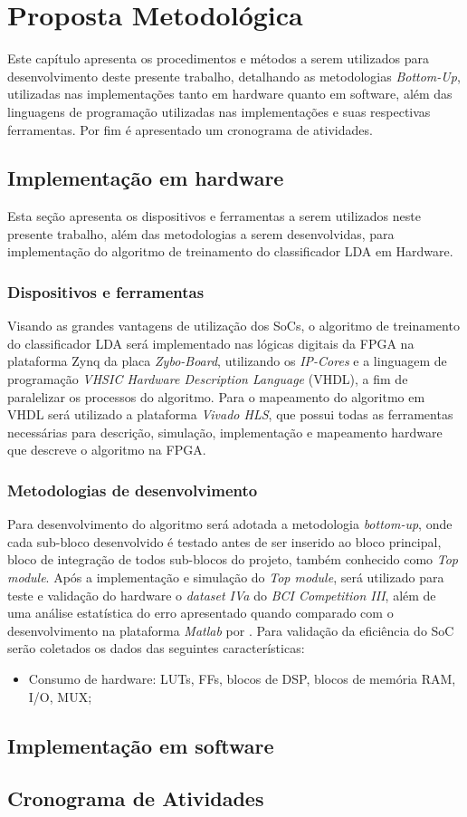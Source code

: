 \chapter[Proposta Metodológica]{Proposta Metodológica}
Este capítulo apresenta os procedimentos e métodos a serem utilizados para desenvolvimento deste presente trabalho, detalhando as metodologias \textit{Bottom-Up}, utilizadas nas implementações tanto em hardware quanto em software, além das linguagens de programação utilizadas nas implementações e suas respectivas ferramentas. Por fim é apresentado um cronograma de atividades.

\section{Implementação em hardware}
Esta seção apresenta os dispositivos e ferramentas a serem utilizados neste presente trabalho, além das metodologias a serem desenvolvidas, para implementação do algoritmo de treinamento do classificador LDA em Hardware.

\subsection{Dispositivos e ferramentas}
Visando as grandes vantagens de utilização dos SoCs, o algoritmo de treinamento do classificador LDA será implementado nas lógicas digitais da FPGA na plataforma Zynq da placa \textit{Zybo-Board}, utilizando os \textit{IP-Cores} e a linguagem de programação \textit{VHSIC Hardware Description Language} (VHDL), a fim de paralelizar os processos do algoritmo. Para o mapeamento do algoritmo em VHDL será utilizado a plataforma \textit{Vivado HLS}, que possui todas as ferramentas necessárias para descrição, simulação, implementação e mapeamento hardware que descreve o algoritmo na FPGA.

\subsection{Metodologias de desenvolvimento}
Para desenvolvimento do algoritmo será adotada a metodologia \textit{bottom-up}, onde cada sub-bloco desenvolvido é testado antes de ser inserido ao bloco principal, bloco de integração de todos sub-blocos do projeto, também conhecido como \textit{Top module}.
Após a implementação e simulação do \textit{Top module}, será utilizado para teste e validação do hardware o \textit{dataset IVa} do \textit{BCI Competition III}, além de uma análise estatística do erro apresentado quando comparado com o desenvolvimento na plataforma \textit{Matlab} por \cite{F.Lotte}.
Para validação da eficiência do SoC serão coletados os dados das seguintes características:
\begin{itemize}
	\item Consumo de hardware: LUTs, FFs, blocos de DSP, blocos de memória RAM, I/O, MUX;
\end{itemize}
 

\section{Implementação em software}


\section{Cronograma de Atividades}


